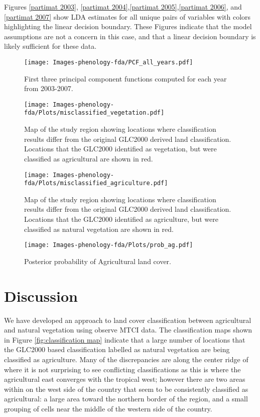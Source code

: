 Figures \ref{partimat 2003}, \ref{partimat 2004},\ref{partimat 2005},\ref{partimat 2006}, and \ref{partimat 2007} show LDA estimates for all unique pairs of variables with colors highlighting the linear decision boundary. These Figures indicate that the model assumptions are not a concern in this case, and that a linear decision boundary is likely sufficient for these data. 

\begin{figure}
	[htbp] \centering 
	\texttt{[image: Images-phenology-fda/PCF\_all\_years.pdf]} \caption{First three principal component functions computed for each year from 2003-2007. } \label{fig:pcf all years} 
\end{figure}

\begin{figure}
	[htbp] \centering 
	\texttt{[image: Images-phenology-fda/Plots/misclassified\_vegetation.pdf]} \caption{Map of the study region showing locations where classification results differ from the original GLC2000 derived land classification. Locations that the GLC2000 identified as vegetation, but were classified as agricultural are shown in red.   } 
	\label{fig:misclassified vegetation} 
\end{figure}

\begin{figure}
	[htbp] \centering 
	\texttt{[image: Images-phenology-fda/Plots/misclassified\_agriculture.pdf]} \caption{Map of the study region showing locations where classification results differ from the original GLC2000 derived land classification. Locations that the GLC2000 identified as agriculture, but were classified as natural vegetation are shown in red.} 
	\label{fig:misclassified agriculture} 
\end{figure}

\begin{figure}
	[htbp] \centering 
	\texttt{[image: Images-phenology-fda/Plots/prob\_ag.pdf]} \caption{ Posterior probability of Agricultural land cover. } 
	\label{fig:probability map} 
\end{figure}


\label{sec:results}


\section{Discussion} 
We have developed an approach to land cover classification between agricultural and natural vegetation using observe MTCI data. The classification maps shown in Figure \ref{fig:classification map} indicate that a large number of locations that the GLC2000 based classification labelled as natural vegetation are being classified as agriculture. Many of the discrepancies are along the center ridge of where it is not surprising to see conflicting classifications as this is where the agricultural east converges with the tropical west; however there are two areas within on the west side of the country that seem to be consistently classified as agricultural: a large area toward the northern border of the region, and a small grouping of cells near the middle of the western side of the country. 

